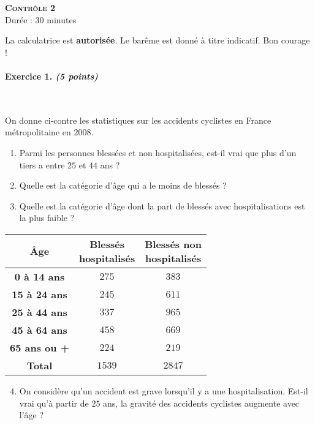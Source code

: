 \documentclass[11pt]{article}
\begin{document}

\begin{center}
  \textbf{\LARGE \textsc{Contrôle 2}}\\[3mm]
Durée : 30 minutes
\end{center}

\noindent La calculatrice est \textbf{autorisée}. Le barême est donné à titre
indicatif. Bon courage !
\vspace{2mm}

\paragraph{Exercice 1. \emph{(5 points)}}~\\[2mm]
\begin{minipage}{.5\textwidth}
On donne ci-contre les statistiques sur les accidents cyclistes en France
métropolitaine en $2008$.
\begin{enumerate}
  \item Parmi les personnes blessées et non hospitalisées, est-il vrai que plus d'un
    tiers a entre $25$ et $44$ ans ?
  \item Quelle est la catégorie d'\^age qui a le moins de blessés ?
  \item Quelle est la catégorie d'\^age dont la part de blessés avec
    hospitalisations est la plus faible ?
\end{enumerate}
\end{minipage}
\begin{minipage}{.5\textwidth}
  \begin{center}
  \def\arraystretch{1.5}
  \begin{tabular}{ccc}
    \toprule
    \textbf{\^Age} & \makecell{\textbf{Blessés}\\\textbf{hospitalisés}} &
    \makecell{\textbf{Blessés non}\\\textbf{hospitalisés}}\\
    \midrule
    \textbf{0 à 14 ans} & $275$ & $383$\\
    \textbf{15 à 24 ans} & $245$ & $611$\\
    \textbf{25 à 44 ans} & $337$ & $965$\\
    \textbf{45 à 64 ans} & $458$ & $669$\\
    \textbf{65 ans ou +} & $224$ & $219$\\
    \textbf{Total} & $1539$ & $2847$\\
    \bottomrule
  \end{tabular}
  \end{center}
\end{minipage}
\begin{enumerate}
    \setcounter{enumi}{3}
  \item On considère qu'un accident est grave lorsqu'il y a une hospitalisation.
    Est-il vrai qu'à partir de $25$ ans, la gravité des accidents cyclistes
    augmente avec l'\^age ?
\end{enumerate}
\end{document}
